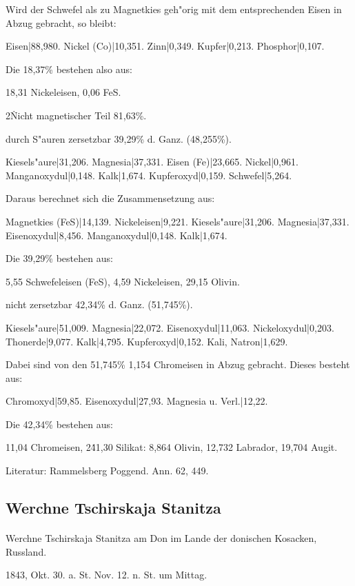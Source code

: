 \documentclass[a4paper, 11pt, oneside]{article}
\begin{document}
Wird der Schwefel als zu Magnetkies geh"orig mit dem entsprechenden Eisen in Abzug gebracht, so bleibt:

Eisen|88,980.  
Nickel (Co)|10,351.  
Zinn|0,349.  
Kupfer|0,213.  
Phosphor|0,107.  

Die 18,37\% bestehen also aus:

18,31 Nickeleisen,  
0,06 FeS.

2\. Nicht magnetischer Teil 81,63\%.

durch S"auren zersetzbar 39,29\% d. Ganz. (48,255\%).

Kiesels"aure|31,206.  
Magnesia|37,331.  
Eisen (Fe)|23,665.  
Nickel|0,961.  
Manganoxydul|0,148.  
Kalk|1,674.  
Kupferoxyd|0,159.  
Schwefel|5,264. 

Daraus berechnet sich die Zusammensetzung aus:

Magnetkies (FeS)|14,139.  
Nickeleisen|9,221.  
Kiesels"aure|31,206.  
Magnesia|37,331.  
Eisenoxydul|8,456.  
Manganoxydul|0,148.  
Kalk|1,674.

Die 39,29\% bestehen aus:

5,55 Schwefeleisen (FeS),  
4,59 Nickeleisen,  
29,15 Olivin.

nicht zersetzbar 42,34\% d. Ganz. (51,745\%).

Kiesels"aure|51,009.  
Magnesia|22,072.  
Eisenoxydul|11,063.  
Nickeloxydul|0,203.  
Thonerde|9,077.  
Kalk|4,795.  
Kupferoxyd|0,152.  
Kali, Natron|1,629.  

Dabei sind von den 51,745\% 1,154 Chromeisen in Abzug gebracht. Dieses besteht aus:

Chromoxyd|59,85.  
Eisenoxydul|27,93.  
Magnesia u. Verl.|12,22.

Die 42,34\% bestehen aus:

1\. 1,04 Chromeisen,  
2\. 41,30 Silikat:  
8,864 Olivin,  
12,732 Labrador,  
19,704 Augit.

\footnotesize
Literatur: Rammelsberg Poggend. Ann. 62, 449.

\subsection{Werchne Tschirskaja Stanitza}
\normalsize
\paragraph{}
Werchne Tschirskaja Stanitza am Don im Lande der donischen Kosacken, Russland.

1843, Okt. 30. a. St. Nov. 12. n. St. um Mittag.
\end{document}
